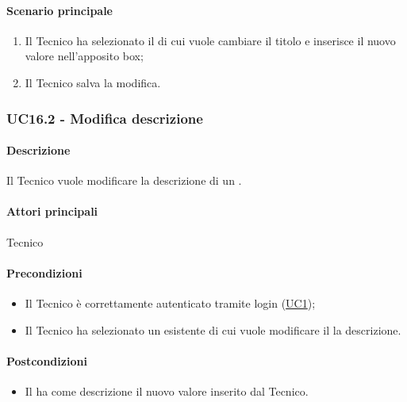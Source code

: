 \paragraph*{Scenario principale}
\begin{enumerate}
  \item Il Tecnico ha selezionato il  di cui vuole cambiare il titolo e inserisce il nuovo valore nell’apposito box;
  \item Il Tecnico salva la modifica.
\end{enumerate}


\subsubsection{UC16.2 - Modifica descrizione }\label{UC16point2}
\paragraph*{Descrizione}
Il Tecnico vuole modificare la descrizione di un .

\paragraph*{Attori principali}
Tecnico

\paragraph*{Precondizioni}
\begin{itemize}
  \item Il Tecnico è correttamente autenticato tramite login (\hyperref[UC1]{UC1});
  \item Il Tecnico ha selezionato un  esistente di cui vuole modificare il la descrizione.
\end{itemize}

\paragraph*{Postcondizioni}
\begin{itemize}
  \item Il  ha come descrizione il nuovo valore inserito dal Tecnico.
\end{itemize}

